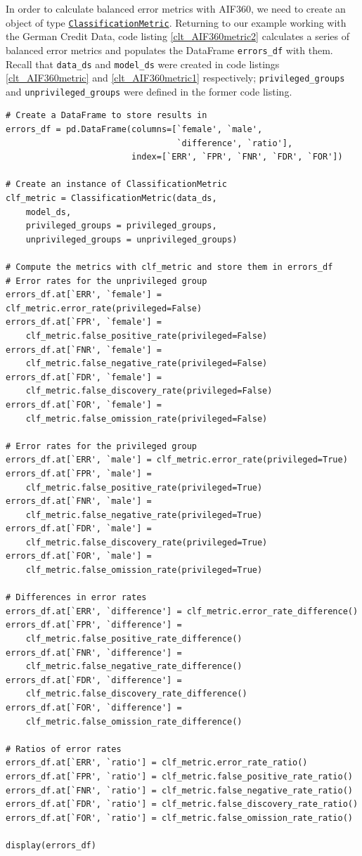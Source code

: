 In order to calculate balanced error metrics with AIF360, we need to create an object of type \href{https://aif360.readthedocs.io/en/latest/modules/generated/aif360.metrics.ClassificationMetric.html}{\texttt{ClassificationMetric}}. Returning to our example working with the German Credit Data, code listing \ref{clt_AIF360metric2} calculates a series of balanced error metrics and populates the DataFrame \texttt{errors\_df} with them. Recall that \texttt{data\_ds} and \texttt{model\_ds} were created in code listings \ref{clt_AIF360metric} and \ref{clt_AIF360metric1} respectively; \texttt{privileged\_groups} and \texttt{unprivileged\_groups} were defined in the former code listing.
%
\begin{lstlisting}[caption={Calculating balanced error metrics with AIF360}, label=clt_AIF360metric2]
# Create a DataFrame to store results in
errors_df = pd.DataFrame(columns=[`female', `male',
                                  `difference', `ratio'],
                         index=[`ERR', `FPR', `FNR', `FDR', `FOR'])

# Create an instance of ClassificationMetric
clf_metric = ClassificationMetric(data_ds,
    model_ds,
    privileged_groups = privileged_groups,
    unprivileged_groups = unprivileged_groups)

# Compute the metrics with clf_metric and store them in errors_df
# Error rates for the unprivileged group
errors_df.at[`ERR', `female'] = clf_metric.error_rate(privileged=False)
errors_df.at[`FPR', `female'] =
    clf_metric.false_positive_rate(privileged=False)
errors_df.at[`FNR', `female'] =
    clf_metric.false_negative_rate(privileged=False)
errors_df.at[`FDR', `female'] =
    clf_metric.false_discovery_rate(privileged=False)
errors_df.at[`FOR', `female'] =
    clf_metric.false_omission_rate(privileged=False)

# Error rates for the privileged group
errors_df.at[`ERR', `male'] = clf_metric.error_rate(privileged=True)
errors_df.at[`FPR', `male'] =
    clf_metric.false_positive_rate(privileged=True)
errors_df.at[`FNR', `male'] =
    clf_metric.false_negative_rate(privileged=True)
errors_df.at[`FDR', `male'] =
    clf_metric.false_discovery_rate(privileged=True)
errors_df.at[`FOR', `male'] =
    clf_metric.false_omission_rate(privileged=True)

# Differences in error rates
errors_df.at[`ERR', `difference'] = clf_metric.error_rate_difference()
errors_df.at[`FPR', `difference'] =
    clf_metric.false_positive_rate_difference()
errors_df.at[`FNR', `difference'] =
    clf_metric.false_negative_rate_difference()
errors_df.at[`FDR', `difference'] =
    clf_metric.false_discovery_rate_difference()
errors_df.at[`FOR', `difference'] =
    clf_metric.false_omission_rate_difference()

# Ratios of error rates
errors_df.at[`ERR', `ratio'] = clf_metric.error_rate_ratio()
errors_df.at[`FPR', `ratio'] = clf_metric.false_positive_rate_ratio()
errors_df.at[`FNR', `ratio'] = clf_metric.false_negative_rate_ratio()
errors_df.at[`FDR', `ratio'] = clf_metric.false_discovery_rate_ratio()
errors_df.at[`FOR', `ratio'] = clf_metric.false_omission_rate_ratio()

display(errors_df)
\end{lstlisting}

